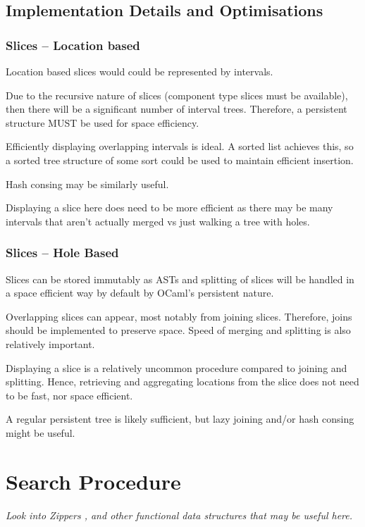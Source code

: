 \subsection{Implementation Details and Optimisations}
\subsubsection{Slices -- Location based}
Location based slices would could be represented by intervals.\par 
Due to the recursive nature of slices (component type slices must be available), then there will be a significant number of interval trees. Therefore, a persistent structure \cite[chapter~2]{PurelyFunctionalDataStructures} MUST be used for space efficiency.\par 
Efficiently displaying overlapping intervals is ideal. A sorted list achieves this, so a sorted  tree structure of some sort could be used to maintain efficient insertion.\par 
Hash consing may be similarly useful.\par 
Displaying a slice here does need to be more efficient as there may be many intervals that aren't actually merged vs just walking a tree with holes.


\subsubsection{Slices -- Hole Based}
Slices can be stored immutably as ASTs and splitting of slices will be handled in a space efficient way by default by OCaml's persistent nature.\par 
Overlapping slices can appear, most notably from joining slices. Therefore, joins should be implemented to preserve space. Speed of merging and splitting is also relatively important.\par 
Displaying a slice is a relatively uncommon procedure compared to joining and splitting. Hence, retrieving and aggregating locations from the slice does not need to be fast, nor space efficient. \par 
A regular persistent tree is likely sufficient, but lazy joining and/or hash consing \cite{HashCons} might be useful.


\section{Search Procedure}
\textit{Look into Zippers \cite{Zipper}, and other functional data structures that may be useful here.
}
